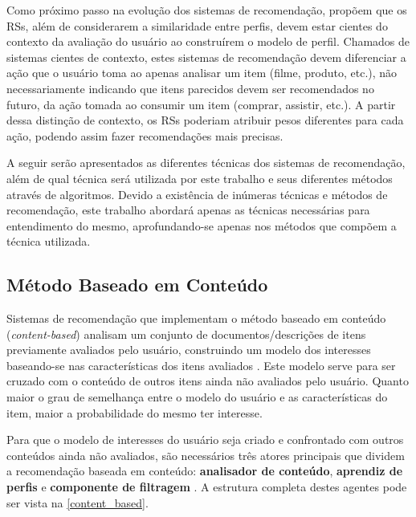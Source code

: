 \documentclass[12pt, openright, oneside, a4paper, brazil]{abntex2}
\begin{document}
Como próximo passo na evolução dos sistemas de recomendação,  propõem que os RSs, além de considerarem a similaridade entre perfis, devem estar cientes do contexto da avaliação do usuário ao construírem o modelo de perfil. Chamados de sistemas cientes de contexto, estes sistemas de recomendação devem diferenciar a ação que o usuário toma ao apenas analisar um item (filme, produto, etc.), não necessariamente indicando que itens parecidos devem ser recomendados no futuro, da ação tomada ao consumir um item (comprar, assistir, etc.). A partir dessa distinção de contexto, os RSs poderiam atribuir pesos diferentes para cada ação, podendo assim fazer recomendações mais precisas.

A seguir serão apresentados as diferentes técnicas dos sistemas de recomendação, além de qual técnica será utilizada por este trabalho e seus diferentes métodos através de algoritmos. Devido a existência de inúmeras técnicas e métodos de recomendação, este trabalho abordará apenas as técnicas necessárias para entendimento do mesmo, aprofundando-se apenas nos métodos que compõem a técnica utilizada.

\subsection{Método Baseado em Conteúdo} \label{recs:content_based}

Sistemas de recomendação que implementam o método baseado em conteúdo (\textit{content-based}) analisam um conjunto de documentos/descrições de itens previamente avaliados pelo usuário, construindo um modelo dos interesses baseando-se nas características dos itens avaliados \cite{mladenic1999text, adomavicius2005toward, lops2011content}. Este modelo serve para ser cruzado com o conteúdo de outros itens ainda não avaliados pelo usuário. Quanto maior o grau de semelhança entre o modelo do usuário e as características do item, maior a probabilidade do mesmo ter interesse.

Para que o modelo de interesses do usuário seja criado e confrontado com outros conteúdos ainda não avaliados, são necessários três atores principais que dividem a recomendação baseada em conteúdo: \textbf{analisador de conteúdo}, \textbf{aprendiz de perfis} e \textbf{componente de filtragem} \cite{lops2011content}. A estrutura completa destes agentes pode ser vista na \autoref{content_based}.
\end{document}
